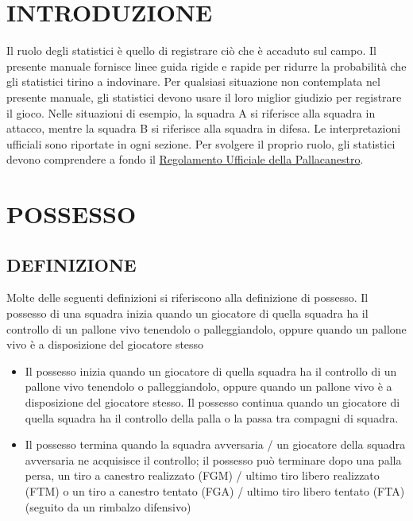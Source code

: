 \section{INTRODUZIONE}
\sectionline

Il ruolo degli statistici è quello di registrare ciò che è accaduto sul campo. Il presente manuale fornisce linee guida rigide e rapide per ridurre la probabilità che gli statistici tirino a indovinare. Per qualsiasi situazione non contemplata nel presente manuale, gli statistici devono usare il loro miglior giudizio per registrare il gioco. Nelle situazioni di esempio, la squadra A si riferisce alla squadra in attacco, mentre la squadra B si riferisce alla squadra in difesa. Le interpretazioni ufficiali sono riportate in ogni sezione. Per svolgere il proprio ruolo, gli statistici devono comprendere a fondo il \href{https://about.fiba.basketball/en/services/resource-hub/downloads}{Regolamento Ufficiale della Pallacanestro}.

\newpage
\setcounter{section}{0}
\renewcommand{\thesection}{\arabic{section}}
\section{POSSESSO}
\sectionline

\subsection{DEFINIZIONE}
\subsectionline

Molte delle seguenti definizioni si riferiscono alla definizione di possesso.
Il possesso di una squadra inizia quando un giocatore di quella squadra ha il controllo di un pallone vivo tenendolo o palleggiandolo, oppure quando un pallone vivo è a disposizione del giocatore stesso

\begin{itemize}

    \item Il possesso inizia quando un giocatore di quella squadra ha il controllo di un pallone vivo tenendolo o palleggiandolo, oppure quando un pallone vivo è a disposizione del giocatore stesso. Il possesso continua quando un giocatore di quella squadra ha il controllo della palla o la passa tra compagni di squadra.
    \item Il possesso termina quando la squadra avversaria / un giocatore della squadra avversaria ne acquisisce il controllo; il possesso può terminare dopo una palla persa, un tiro a canestro realizzato (FGM) / ultimo tiro libero realizzato (FTM) o un tiro a canestro tentato (FGA) / ultimo tiro libero tentato (FTA) (seguito da un rimbalzo difensivo)

\end{itemize}

